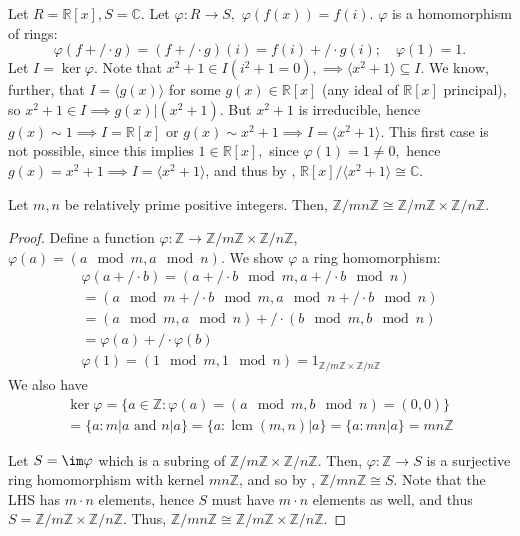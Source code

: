 \documentclass[12pt,oneside]{article}
\DeclareMathOperator*{\lcm}{lcm}
\begin{document}
\begin{example}
Let $R = \mathbb{R}[x], S = \mathbb{C}$. Let $\varphi : R \to S,$ $\varphi(f(x)) = f(i)$. $\varphi$ is a homomorphism of rings:
\[
\varphi (f +/\cdot g) = (f+/\cdot g)(i) = f(i) +/\cdot g(i); \quad \varphi (1) = 1.
\]
Let $I = \ker \varphi$. Note that $x^2 + 1 \in I (i^2 + 1 = 0), \implies \langle x^2 + 1 \rangle \subseteq I$. We know, further, that $I = \langle g(x)\rangle$ for some $g(x) \in \mathbb{R}[x]$ (any ideal of $\mathbb{R}[x]$ principal), so $x^2 + 1 \in I \implies g(x) | (x^2+1)$. But $x^2 + 1$ is irreducible, hence $g(x) \sim 1 \implies I = \mathbb{R}[x]$ or $g(x) \sim x^2 + 1 \implies I = \langle x^2 + 1\rangle$. This first case is not possible, since this implies $1 \in \mathbb{R}[x],$ since $\varphi(1) = 1 \neq 0,$ hence $g(x) = x^2 + 1 \implies I = \langle x^2 + 1 \rangle$, and thus by , $\mathbb{R}[x]/\langle x^2 + 1\rangle \cong \mathbb{C}$.
\end{example}

\begin{theorem}\label{thm:chineseremaindertheorem}
  Let $m,n$ be relatively prime positive integers. Then, $\mathbb{Z}/mn\mathbb{Z} \cong \mathbb{Z}/m \mathbb{Z} \times \mathbb{Z}/n \mathbb{Z}$.
\end{theorem}

\begin{proof}
Define a function $\varphi : \mathbb{Z} \to \mathbb{Z}/m\mathbb{Z} \times \mathbb{Z}/n\mathbb{Z}$, $\varphi(a) = (a \mod m, a \mod n)$. We show $\varphi$ a ring homomorphism:
\begin{align*}
\varphi(a +/\cdot b) = (a+/\cdot b \mod m, a + /\cdot b \mod n) \\
= (a \mod m + /\cdot b \mod m, a \mod n + /\cdot b \mod n)   \\
= (a \mod m, a \mod n) +/\cdot (b \mod m, b \mod n)\\
= \varphi(a) +/\cdot \varphi(b)\\
\varphi(1) = (1 \mod m, 1 \mod n) = 1_{\mathbb{Z}/m\mathbb{Z} \times \mathbb{Z}/n \mathbb{Z}}
\end{align*}
We also have \begin{align*}
\ker \varphi  = \{a  \in \mathbb{Z} : \varphi(a) = (a \mod m, b \mod n) = (0,0)\} \\
= \{a : m | a \text{ and } n| a\} = \{a : \lcm (m,n) | a\} = \{a : mn | a\} = mn\mathbb{Z}
\end{align*}

Let $S = \im \varphi$ which is a subring of $\mathbb{Z}/m \mathbb{Z} \times \mathbb{Z}/n \mathbb{Z}$. Then, $\varphi :\mathbb{Z} \to S$ is a surjective ring homomorphism with kernel $mn \mathbb{Z}$, and so by , $\mathbb{Z}/mn \mathbb{Z} \cong S$. Note that the LHS has $m \cdot n$ elements, hence $S$ must have $m \cdot n$ elements as well, and thus $S = \mathbb{Z} /m \mathbb{Z} \times \mathbb{Z}/n \mathbb{Z}$. Thus, $\mathbb{Z}/mn \mathbb{Z} \cong \mathbb{Z}/m\mathbb{Z} \times \mathbb{Z}/n\mathbb{Z}$.
\end{proof}
\end{document}
